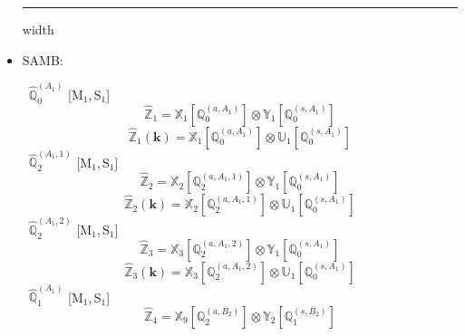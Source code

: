 \documentclass[fleqn,10pt,landscape]{article}
\begin{document}
\begin{itemize}
 \hfil \hrule height 1mm width \textwidth \hfil

\item SAMB:

\vspace{4mm}
\noindent {} $\,\,\,\hat{\mathbb{Q}}_{0}^{(A_{1})}$ [M$_{1}$,\,S$_{1}$]
\begin{dmath*}
\hat{\mathbb{Z}}_{1}=\mathbb{X}_{1}[\mathbb{Q}_{0}^{(a,A_{1})}] \otimes\mathbb{Y}_{1}[\mathbb{Q}_{0}^{(s,A_{1})}]
\end{dmath*}
\begin{dmath*}
\hat{\mathbb{Z}}_{1}(\bm{k})=\mathbb{X}_{1}[\mathbb{Q}_{0}^{(a,A_{1})}] \otimes\mathbb{U}_{1}[\mathbb{Q}_{0}^{(s,A_{1})}]
\end{dmath*}
\vspace{4mm}
\noindent {} $\,\,\,\hat{\mathbb{Q}}_{2}^{(A_{1},1)}$ [M$_{1}$,\,S$_{1}$]
\begin{dmath*}
\hat{\mathbb{Z}}_{2}=\mathbb{X}_{2}[\mathbb{Q}_{2}^{(a,A_{1},1)}] \otimes\mathbb{Y}_{1}[\mathbb{Q}_{0}^{(s,A_{1})}]
\end{dmath*}
\begin{dmath*}
\hat{\mathbb{Z}}_{2}(\bm{k})=\mathbb{X}_{2}[\mathbb{Q}_{2}^{(a,A_{1},1)}] \otimes\mathbb{U}_{1}[\mathbb{Q}_{0}^{(s,A_{1})}]
\end{dmath*}
\vspace{4mm}
\noindent {} $\,\,\,\hat{\mathbb{Q}}_{2}^{(A_{1},2)}$ [M$_{1}$,\,S$_{1}$]
\begin{dmath*}
\hat{\mathbb{Z}}_{3}=\mathbb{X}_{3}[\mathbb{Q}_{2}^{(a,A_{1},2)}] \otimes\mathbb{Y}_{1}[\mathbb{Q}_{0}^{(s,A_{1})}]
\end{dmath*}
\begin{dmath*}
\hat{\mathbb{Z}}_{3}(\bm{k})=\mathbb{X}_{3}[\mathbb{Q}_{2}^{(a,A_{1},2)}] \otimes\mathbb{U}_{1}[\mathbb{Q}_{0}^{(s,A_{1})}]
\end{dmath*}
\vspace{4mm}
\noindent {} $\,\,\,\hat{\mathbb{Q}}_{1}^{(A_{1})}$ [M$_{1}$,\,S$_{1}$]
\begin{dmath*}
\hat{\mathbb{Z}}_{4}=\mathbb{X}_{9}[\mathbb{Q}_{2}^{(a,B_{2})}] \otimes\mathbb{Y}_{2}[\mathbb{Q}_{1}^{(s,B_{2})}]
\end{dmath*}
\begin{dmath*}

\end{dmath*}
\end{itemize}
\end{document}
